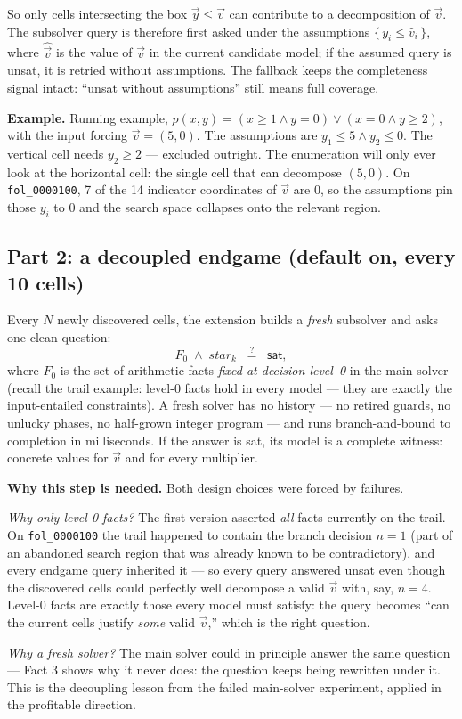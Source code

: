 \documentclass[11pt]{article}
\newcommand{\vv}{\ensuremath{\vec{v}}\xspace}
\newcommand{\vy}{\ensuremath{\vec{y}}\xspace}
\newcommand{\why}[1]{\begin{whybox}\textbf{Why this step is needed.} #1\end{whybox}}
\begin{document}
So only cells intersecting the box $\vy \le \vv$ can contribute to a
decomposition of $\vv$. The subsolver query is therefore first asked under
the assumptions $\{\,y_i \le \hat v_i\,\}$, where $\hat{\vv}$ is the value
of $\vv$ in the current candidate model; if the assumed query is
\textsf{unsat}, it is retried without assumptions. The fallback keeps the
completeness signal intact: ``\textsf{unsat} without assumptions'' still
means full coverage.

\begin{exbox}
\textbf{Example.} Running example,
$p(x,y) = (x \ge 1 \wedge y = 0) \vee (x = 0 \wedge y \ge 2)$, with the
input forcing $\vv = (5,0)$. The assumptions are
$y_1 \le 5 \wedge y_2 \le 0$. The vertical cell needs $y_2 \ge 2$ ---
excluded outright. The enumeration will only ever look at the horizontal
cell: the single cell that can decompose $(5,0)$. On
\texttt{fol\_0000100}, 7 of the 14 indicator coordinates of $\vv$ are
$0$, so the assumptions pin those $y_i$ to $0$ and the search space
collapses onto the relevant region.
\end{exbox}

\subsection{Part 2: a decoupled endgame (default on, every 10 cells)}

Every $N$ newly discovered cells, the extension builds a \emph{fresh}
subsolver and asks one clean question:
\[
F_0 \;\wedge\; \mathit{star}_k \;\;\stackrel{?}{=}\;\; \textsf{sat},
\]
where $F_0$ is the set of arithmetic facts \emph{fixed at decision
level~0} in the main solver (recall the trail example: level-0 facts hold
in every model --- they are exactly the input-entailed constraints). A
fresh solver has no history --- no retired guards, no unlucky phases, no
half-grown integer program --- and runs branch-and-bound to completion in
milliseconds. If the answer is \textsf{sat}, its model is a complete
witness: concrete values for $\vv$ and for every multiplier.

\why{Both design choices were forced by failures.

\emph{Why only level-0 facts?} The first version asserted \emph{all}
facts currently on the trail. On \texttt{fol\_0000100} the trail happened
to contain the branch decision $n = 1$ (part of an abandoned search
region that was already known to be contradictory), and every endgame
query inherited it --- so every query answered \textsf{unsat} even though
the discovered cells could perfectly well decompose a valid $\vv$ with,
say, $n = 4$. Level-0 facts are exactly those every model must satisfy:
the query becomes ``can the current cells justify \emph{some} valid
$\vv$,'' which is the right question.

\emph{Why a fresh solver?} The main solver could in principle answer the
same question --- Fact 3 shows why it never does: the question keeps being
rewritten under it. This is the decoupling lesson from the failed
main-solver experiment, applied in the profitable direction.}
\end{document}
